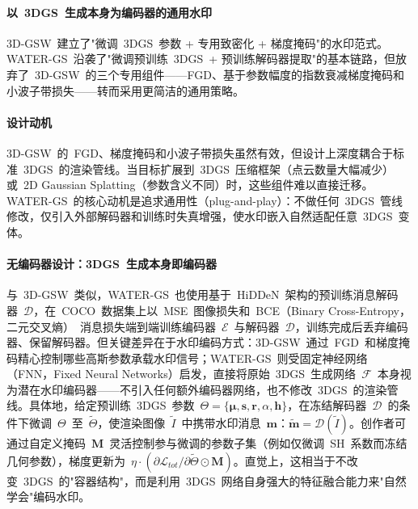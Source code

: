 \paragraph{以~3DGS~生成本身为编码器的通用水印}

3D-GSW~建立了"微调~3DGS~参数 + 专用致密化 + 梯度掩码"的水印范式。WATER-GS~沿袭了"微调预训练~3DGS~+ 预训练解码器提取"的基本链路，但放弃了~3D-GSW~的三个专用组件——FGD、基于参数幅度的指数衰减梯度掩码和小波子带损失——转而采用更简洁的通用策略。

\paragraph{设计动机}
3D-GSW~的~FGD、梯度掩码和小波子带损失虽然有效，但设计上深度耦合于标准~3DGS~的渲染管线。当目标扩展到~3DGS~压缩框架（点云数量大幅减少）或~2D Gaussian Splatting（参数含义不同）时，这些组件难以直接迁移。WATER-GS~的核心动机是追求通用性（plug-and-play）：不做任何~3DGS~管线修改，仅引入外部解码器和训练时失真增强，使水印嵌入自然适配任意~3DGS~变体。

\paragraph{无编码器设计：3DGS~生成本身即编码器}
与~3D-GSW~类似，WATER-GS~也使用基于~HiDDeN~架构的预训练消息解码器~$\mathcal{D}$，在~COCO~数据集上以~MSE~图像损失和~BCE（Binary Cross-Entropy，二元交叉熵）~消息损失端到端训练编码器~$\mathcal{E}$~与解码器~$\mathcal{D}$，训练完成后丢弃编码器、保留解码器。但关键差异在于水印编码方式：3D-GSW~通过~FGD~和梯度掩码精心控制哪些高斯参数承载水印信号；WATER-GS~则受固定神经网络（FNN，Fixed Neural Networks）启发，直接将原始~3DGS~生成网络~$\mathcal{F}$~本身视为潜在水印编码器——不引入任何额外编码器网络，也不修改~3DGS~的渲染管线。具体地，给定预训练~3DGS~参数~$\Theta = \{\boldsymbol{\mu}, \boldsymbol{s}, \boldsymbol{r}, \alpha, \boldsymbol{h}\}$，在冻结解码器~$\mathcal{D}$~的条件下微调~$\Theta$~至~$\tilde{\Theta}$，使渲染图像~$\tilde{I}$~中携带水印消息~$\boldsymbol{m}$：$\tilde{\boldsymbol{m}} = \mathcal{D}(\tilde{I})$。创作者可通过自定义掩码~$\boldsymbol{M}$~灵活控制参与微调的参数子集（例如仅微调~SH~系数而冻结几何参数），梯度更新为~$\eta \cdot (\partial \mathcal{L}_{tot} / \partial \tilde{\Theta} \odot \boldsymbol{M})$。直觉上，这相当于不改变~3DGS~的"容器结构"，而是利用~3DGS~网络自身强大的特征融合能力来"自然学会"编码水印。


